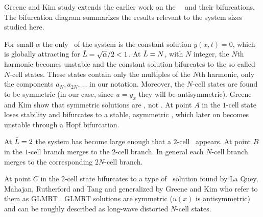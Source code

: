 Greene and Kim study extends the earlier work
on the \KS\ \eqva\ and their bifurcations. The
bifurcation diagram  summarizes the results
relevant to the system sizes studied here.

For small $\alpha$ the only \eqv\ of the system is the constant solution $y(x,t)=0$,
which is globally attracting
for $\tilde{L}=\sqrt{\alpha}/2<1$. At $\tilde{L}=N$, with $N$ integer,
the $N$th harmonic becomes unstable and the constant solution
bifurcates to the so called $N$-cell states.
These states contain only the multiples of the $N$th
harmonic, {\ie} only the components $a_N,a_{2N},...$ in our notation.
Moreover, the $N$-cell states are found to be symmetric (in our case, since $u=y_x$ they will be
antisymmetric).
Greene and Kim show that symmetric solutions are \eqva, not \reqva.
At point $A$ in  the $1$-cell state loses stability
and bifurcates to a stable,
asymmetric \reqv, which later on becomes unstable through a Hopf bifurcation.

At $\tilde{L}=2$ the system has become large enough that a $2$-cell \eqv\ appears. At point $B$
in  the $1$-cell branch merges to the $2$-cell branch. In general each $N$-cell branch merges to the corresponding $2N$-cell branch.

At point $C$ in  the $2$-cell state
bifurcates to a type of \eqv\ solution found by La Quey,
Mahajan, Rutherford and Tang and generalized by
Greene and Kim who refer to them as GLMRT \eqva. GLMRT
solutions are symmetric ($u(x)$ is antisymmetric) and can be
roughly described as long-wave distorted $N$-cell states.

